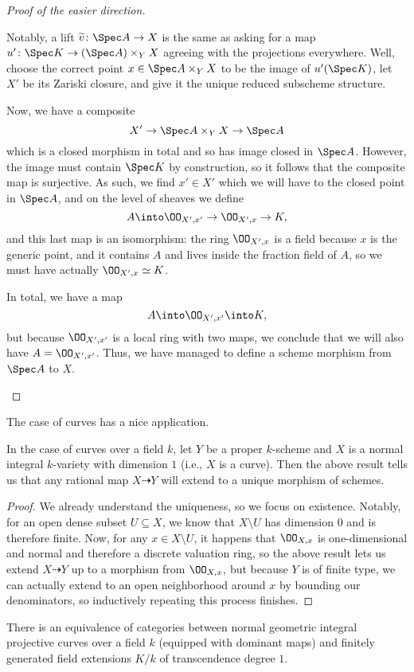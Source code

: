 \documentclass[../notes.tex]{subfiles}
\begin{document}
\begin{proof}[Proof of the easier direction]
\begin{itemize}
		Notably, a lift $\widetilde v\colon\Spec A\to X$ is the same as asking for a map $u'\colon\Spec K\to(\Spec A)\times_YX$ agreeing with the projections everywhere. Well, choose the correct point $x\in\Spec A\times_YX$ to be the image of $u'(\Spec K)$, let $X'$ be its Zariski closure, and give it the unique reduced subscheme structure.

		Now, we have a composite
		\[X'\to\Spec A\times_YX\to\Spec A\]
		which is a closed morphism in total and so has image closed in $\Spec A$. However, the image must contain $\Spec K$ by construction, so it follows that the composite map is surjective. As such, we find $x'\in X'$ which we will have to the closed point in $\Spec A$, and on the level of sheaves we define
		\[A\into\OO_{X',x'}\to\OO_{X',x}\to K,\]
		and this last map is an isomorphism: the ring $\OO_{X',x}$ is a field because $x$ is the generic point, and it contains $A$ and lives inside the fraction field of $A$, so we must have actually $\OO_{X',x}\simeq K$.

		In total, we have a map
		\[A\into\OO_{X',x'}\into K,\]
		but because $\OO_{X',x'}$ is a local ring with two maps, we conclude that we will also have $A=\OO_{X',x'}$. Thus, we have managed to define a scheme morphism from $\Spec A$ to $X$.
		\qedhere
	\end{itemize}
\end{proof}
The case of curves has a nice application.
\begin{cor}
	In the case of curves over a field $k$, let $Y$ be a proper $k$-scheme and $X$ is a normal integral $k$-variety with dimension $1$ (i.e., $X$ is a curve). Then the above result tells us that any rational map $X\dashrightarrow Y$ will extend to a unique morphism of schemes.
\end{cor}
\begin{proof}
	We already understand the uniqueness, so we focus on existence. Notably, for an open dense subset $U\subseteq X$, we know that $X\setminus U$ has dimension $0$ and is therefore finite. Now, for any $x\in X\setminus U$, it happens that $\OO_{X,x}$ is one-dimensional and normal and therefore a discrete valuation ring, so the above result lets us extend $X\dashrightarrow Y$ up to a morphism from $\OO_{X,x}$, but because $Y$ is of finite type, we can actually extend to an open neighborhood around $x$ by bounding our denominators, so inductively repeating this process finishes.
\end{proof}
\begin{corollary}
	There is an equivalence of categories between normal geometric integral projective curves over a field $k$ (equipped with dominant maps) and finitely generated field extensions $K/k$ of transcendence degree $1$.
\end{corollary}
\end{document}
